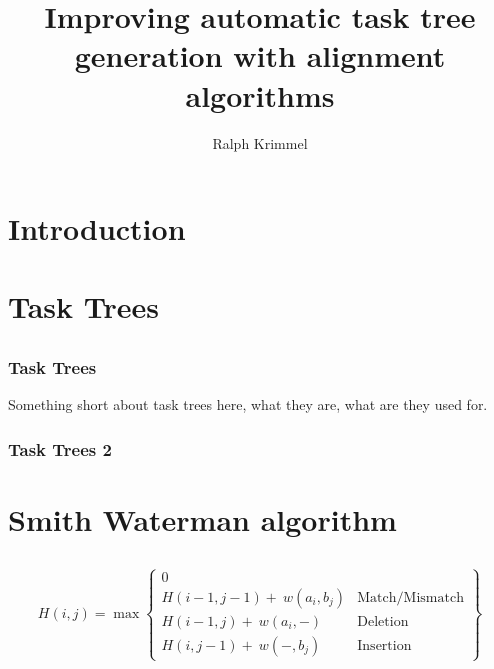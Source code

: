 \documentclass{beamer}
\title{Improving automatic task tree generation with alignment algorithms}
\author{Ralph Krimmel}
\begin{document}
\section{Introduction}
\subsection*{}
\begin{frame}
	\maketitle
\end{frame}

\section{Task Trees}
\subsection*{}


\begin{frame}
	\frametitle{Task Trees}

	Something short about task trees here, what they are, what are they used for. 
\end{frame}

\begin{frame}
	\frametitle{Task Trees 2}
\end{frame}

\section{Smith Waterman algorithm}
\subsection*{}


\begin{frame}


	\[
	H(i,j) = \max 
	\begin{Bmatrix}
		0  \\
		H(i-1,j-1) + \ w(a_i,b_j) & \text{Match/Mismatch} \\
		H(i-1,j) + \ w(a_i,-) & \text{Deletion} \\
		H(i,j-1) + \ w(-,b_j) & \text{Insertion}
	\end{Bmatrix}
	\]
\end{frame}
\end{document}
